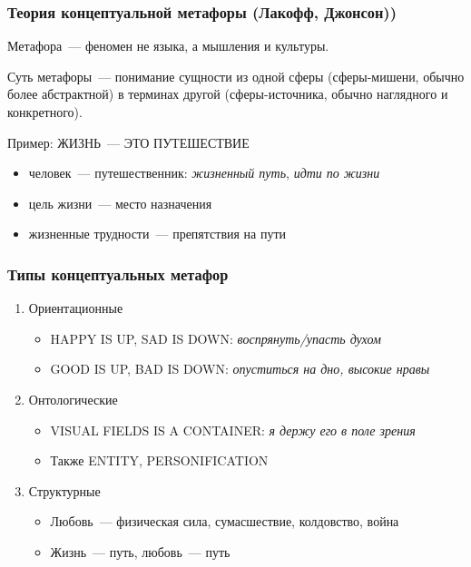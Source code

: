 \begin{frame}
  \frametitle{Теория концептуальной метафоры (Лакофф, Джонсон))}

  Метафора~--- феномен не языка, а мышления и культуры.

  Суть метафоры~--- понимание сущности из одной сферы (сферы-мишени, обычно более абстрактной) в терминах другой (сферы-источника, обычно наглядного и конкретного).

  \vfill

  Пример: \textsc{ЖИЗНЬ~--- ЭТО ПУТЕШЕСТВИЕ} \begin{itemize}
    \item человек~--- путешественник: \textit{жизненный путь}, \textit{идти по жизни}
    \item цель жизни~--- место назначения
    \item жизненные трудности~--- препятствия на пути
  \end{itemize}
\end{frame}

\begin{frame}
  \frametitle{Типы концептуальных метафор}

  \begin{enumerate}
    \item Ориентационные \begin{itemize}
      \item \textsc{HAPPY IS UP, SAD IS DOWN}: \textit{воспрянуть/упасть духом}
      \item \textsc{GOOD IS UP, BAD IS DOWN}: \textit{опуститься на дно, высокие нравы}
    \end{itemize}
    \item Онтологические \begin{itemize}
      \item \textsc{VISUAL FIELDS IS A CONTAINER}: \textit{я держу его в поле зрения}
      \item Также \textsc{ENTITY}, \textsc{PERSONIFICATION}
    \end{itemize}
    \item Структурные \begin{itemize}
      \item Любовь~--- физическая сила, сумасшествие, колдовство, война
      \item Жизнь~--- путь, любовь~--- путь
    \end{itemize}
  \end{enumerate}
\end{frame}

